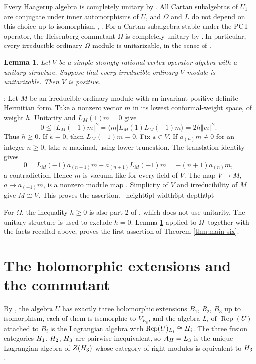 \documentclass[leqno]{article}
\let\cal\relax
\newcommand{\cal}{\mathcal}
\renewcommand{\leq}{\ensuremath{\leqslant}}
\renewcommand{\geq}{\ensuremath{\geqslant}}
\newcommand{\qed}{\hfill \vrule height6pt  width6pt depth0pt}
\newcommand{\norm}[1]{\left\Vert#1\right\Vert}
\DeclareMathOperator{\Rep}{Rep}
\newtheorem{lemma}[thm]{Lemma}
\newenvironment{proof}[1][]{\noindent {\it Proof #1} : }{\hbox{~}\qed
\smallskip
}
\numberwithin{equation}{section}
\begin{document}
Every Haagerup algebra is completely unitary by \cite[Theorem 8.6 p.~60]{Arh26b}. All Cartan subalgebras of $U_1$ are conjugate under inner automorphisms of $U$, and $\Omega$ and $L$ do not depend on this choice up to isomorphism \cite[Section 12]{Arh26a}, \cite[p.~57]{Arh26b}. For a Cartan subalgebra stable under the PCT operator, the Heisenberg commutant $\Omega$ is completely unitary by \cite[Lemma 8.2 p.~57]{Arh26b}. In particular, every irreducible ordinary $\Omega$-module is unitarizable, in the sense of \cite[Section 5]{CKLW18}.

\begin{lemma}
\label{lem:positive}
Let $V$ be a simple strongly rational vertex operator algebra with a unitary structure. Suppose that every irreducible ordinary $V$-module is unitarizable. Then $V$ is positive.
\end{lemma}

\begin{proof}
Let $M$ be an irreducible ordinary module with an invariant positive definite Hermitian form. Take a nonzero vector $m$ in its lowest conformal-weight space, of weight $h$. Unitarity and $L_M(1)m = 0$ give
\[
0 \leq \norm{L_M(-1)m}^2 = \langle m | L_M(1)L_M(-1)m\rangle = 2h\norm m^2.
\]
Thus $h \geq 0$. If $h = 0$, then $L_M(-1)m = 0$. Fix $a \in V$. If $a_{(n)}m \neq 0$ for an integer $n \geq 0$, take $n$ maximal, using lower truncation. The translation identity gives
\[
0 = L_M(-1)a_{(n+1)}m-a_{(n+1)}L_M(-1)m = -(n+1)a_{(n)}m,
\]
a contradiction. Hence $m$ is vacuum-like for every field of $V$. The map $V \to M$, $a \mapsto a_{(-1)}m$, is a nonzero module map \cite[Section 4.7]{LL04}. Simplicity of $V$ and irreducibility of $M$ give $M \cong V$. This proves the assertion.
\end{proof}

For $\Omega$, the inequality $h \geq 0$ is also part 2 of \cite[Proposition 12.2 p.~62]{Arh26a}, which does not use unitarity. The unitary structure is used to exclude $h = 0$. Lemma \ref{lem:positive} applied to $\Omega$, together with the facts recalled above, proves the first assertion of Theorem \ref{thm:main-six}.

\section{The holomorphic extensions and the commutant}
\label{sec:extension}

By \cite[Proposition 3.3 p.~16 and Theorem 3.9 p.~19]{Arh26b}, the algebra $U$ has exactly three holomorphic extensions $B_1$, $B_2$, $B_3$ up to isomorphism, each of them is isomorphic to $V_{E_8}$, and the algebra $L_i$ of $\Rep(U)$ attached to $B_i$ is the Lagrangian algebra with $\Rep(U)_{L_i} \cong \cal H_i$. The three fusion categories $\cal H_1$, $\cal H_2$, $\cal H_3$ are pairwise inequivalent, so $\cal A_{\cal H} = L_3$ is the unique Lagrangian algebra of $Z(\cal H_3)$ whose category of right modules is equivalent to $\cal H_3$.
\end{document}
